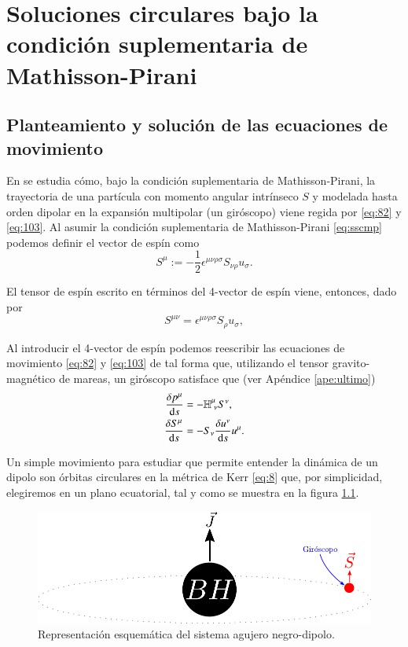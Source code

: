 \chapter{Soluciones circulares bajo la condición suplementaria de Mathisson-Pirani}
\label{cap:4}
\newpage

\section{Planteamiento y solución de las ecuaciones de movimiento}

En \cite{Costa-Natario-Zilhao} se estudia cómo, bajo la condición suplementaria de Mathisson-Pirani, la trayectoria de una partícula con momento angular intrínseco $S$ y modelada hasta orden dipolar en la expansión multipolar (un giróscopo) viene regida por \eqref{eq:82} y \eqref{eq:103}. Al asumir la condición suplementaria de Mathisson-Pirani \eqref{eq:sscmp} podemos definir el vector de espín como
\begin{equation}
S^{\mu} := -\frac{1}{2} \epsilon^{\mu \nu \rho \sigma} S_{\nu \rho} u_{\sigma}.
\end{equation}

El tensor de espín escrito en términos del 4-vector de espín viene, entonces, dado por
\begin{equation}
\label{spintensor}
S^{\mu \nu} = \epsilon^{\mu \nu \rho \sigma} S_{\rho} u_{\sigma},
\end{equation}

Al introducir el 4-vector de espín podemos reescribir las ecuaciones de movimiento \eqref{eq:82} y \eqref{eq:103} de tal forma que, utilizando el tensor gravito-magnético de mareas, un giróscopo satisface que (ver Apéndice \ref{ape:ultimo})
\begin{align}
\label{dph}
\frac{\delta p^{\mu}}{\mathrm{d}s} &= -\mathbb{H}^{\mu}_{\ \nu} S^{\nu},\\
\label{dps}
\frac{\delta S^{\mu}}{\mathrm{d}s} &= -S_{\nu} \frac{\delta u^{\nu}}{\mathrm{d}s} u^{\mu}.
\end{align}

Un simple movimiento para estudiar que permite entender la dinámica de un dipolo son órbitas circulares en la métrica de Kerr \eqref{eq:8} que, por simplicidad, elegiremos en un plano ecuatorial, tal y como se muestra en la figura \ref{fig:7}.
\begin{figure}[!ht]
\centering
\includegraphics[scale=0.9]{images/solucion-en-kerr.pdf}
\caption[Solución helicoidal en Kerr]{Representación esquemática del sistema agujero negro-dipolo.}
\label{fig:7}
\end{figure}


